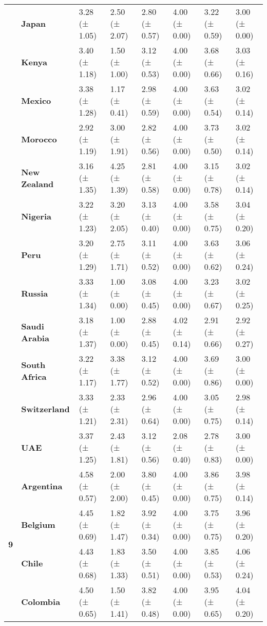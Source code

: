 \begin{longtable}{llllllll}
\textbf{} & \textbf{Japan} & 3.28 (± 1.05) & 2.50 (± 2.07) & 2.80 (± 0.57) & 4.00 (± 0.00) & 3.22 (± 0.59) & 3.00 (± 0.00) \\
\textbf{} & \textbf{Kenya} & 3.40 (± 1.18) & 1.50 (± 1.00) & 3.12 (± 0.53) & 4.00 (± 0.00) & 3.68 (± 0.66) & 3.03 (± 0.16) \\
\textbf{} & \textbf{Mexico} & 3.38 (± 1.28) & 1.17 (± 0.41) & 2.98 (± 0.59) & 4.00 (± 0.00) & 3.63 (± 0.54) & 3.02 (± 0.14) \\
\textbf{} & \textbf{Morocco} & 2.92 (± 1.19) & 3.00 (± 1.91) & 2.82 (± 0.56) & 4.00 (± 0.00) & 3.73 (± 0.50) & 3.02 (± 0.14) \\
\textbf{} & \textbf{New Zealand} & 3.16 (± 1.35) & 4.25 (± 1.39) & 2.81 (± 0.58) & 4.00 (± 0.00) & 3.15 (± 0.78) & 3.02 (± 0.14) \\
\textbf{} & \textbf{Nigeria} & 3.22 (± 1.23) & 3.20 (± 2.05) & 3.13 (± 0.40) & 4.00 (± 0.00) & 3.58 (± 0.75) & 3.04 (± 0.20) \\
\textbf{} & \textbf{Peru} & 3.20 (± 1.29) & 2.75 (± 1.71) & 3.11 (± 0.52) & 4.00 (± 0.00) & 3.63 (± 0.62) & 3.06 (± 0.24) \\
\textbf{} & \textbf{Russia} & 3.33 (± 1.34) & 1.00 (± 0.00) & 3.08 (± 0.45) & 4.00 (± 0.00) & 3.23 (± 0.67) & 3.02 (± 0.25) \\
\textbf{} & \textbf{Saudi Arabia} & 3.18 (± 1.37) & 1.00 (± 0.00) & 2.88 (± 0.45) & 4.02 (± 0.14) & 2.91 (± 0.66) & 2.92 (± 0.27) \\
\textbf{} & \textbf{South Africa} & 3.22 (± 1.17) & 3.38 (± 1.77) & 3.12 (± 0.52) & 4.00 (± 0.00) & 3.69 (± 0.86) & 3.00 (± 0.00) \\
\textbf{} & \textbf{Switzerland} & 3.33 (± 1.21) & 2.33 (± 2.31) & 2.96 (± 0.64) & 4.00 (± 0.00) & 3.05 (± 0.75) & 2.98 (± 0.14) \\
\textbf{} & \textbf{UAE} & 3.37 (± 1.25) & 2.43 (± 1.81) & 3.12 (± 0.56) & 2.08 (± 0.40) & 2.78 (± 0.83) & 3.00 (± 0.00) \\
\cline{1-8}
\multirow[t]{19}{*}{\textbf{9}} & \textbf{Argentina} & 4.58 (± 0.57) & 2.00 (± 2.00) & 3.80 (± 0.45) & 4.00 (± 0.00) & 3.86 (± 0.75) & 3.98 (± 0.14) \\
\textbf{} & \textbf{Belgium} & 4.45 (± 0.69) & 1.82 (± 1.47) & 3.92 (± 0.34) & 4.00 (± 0.00) & 3.75 (± 0.75) & 3.96 (± 0.20) \\
\textbf{} & \textbf{Chile} & 4.43 (± 0.68) & 1.83 (± 1.33) & 3.50 (± 0.51) & 4.00 (± 0.00) & 3.85 (± 0.53) & 4.06 (± 0.24) \\
\textbf{} & \textbf{Colombia} & 4.50 (± 0.65) & 1.50 (± 1.41) & 3.82 (± 0.48) & 4.00 (± 0.00) & 3.95 (± 0.65) & 4.04 (± 0.20) \\

\end{longtable}
